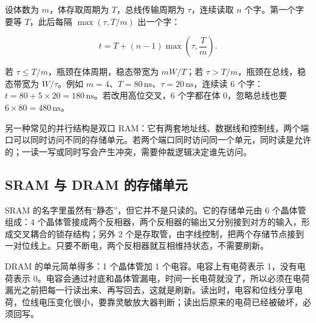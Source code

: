 设体数为 \(m\)，体存取周期为 \(T\)，总线传输周期为 \(\tau\)，连续读取 \(n\) 个字。第一个字要等 \(T\)，此后每隔 \(\max(\tau,T/m)\) 出一个字：

\[
t = T + (n-1)\max\!\left(\tau,\frac{T}{m}\right).
\]

若 \(\tau\le T/m\)，瓶颈在体周期，稳态带宽为 \(mW/T\)；若 \(\tau>T/m\)，瓶颈在总线，稳态带宽为 \(W/\tau\)。例如 \(m=4\)、\(T=80\,\mathrm{ns}\)、\(\tau=20\,\mathrm{ns}\)，连续读 6 个字：\(t=80+5\times20=180\,\mathrm{ns}\)。若改用高位交叉，6 个字都在体 0，忽略总线也要 \(6\times80=480\,\mathrm{ns}\)。

另一种常见的并行结构是双口 RAM：它有两套地址线、数据线和控制线，两个端口可以同时访问不同的存储单元。若两个端口同时访问同一个单元，同时读是允许的；一读一写或同时写会产生冲突，需要仲裁逻辑决定谁先访问。

\subsection{SRAM 与 DRAM 的存储单元}

SRAM 的名字里虽然有“静态”，但它并不是只读的。它的存储单元由 6 个晶体管组成：4 个晶体管接成两个反相器，两个反相器的输出又分别接到对方的输入，形成交叉耦合的锁存结构；另外 2 个是存取管，由字线控制，把两个存储节点接到一对位线上。只要不断电，两个反相器就互相维持状态，不需要刷新。

DRAM 的单元简单得多：1 个晶体管加 1 个电容。电容上有电荷表示 1，没有电荷表示 0。电容会通过衬底和晶体管漏电，时间一长电荷就没了，所以必须在电荷漏光之前把每一行读出来、再写回去，这就是刷新。读出时，电容和位线分享电荷，位线电压变化很小，要靠灵敏放大器判断；读出后原来的电荷已经被破坏，必须回写。


